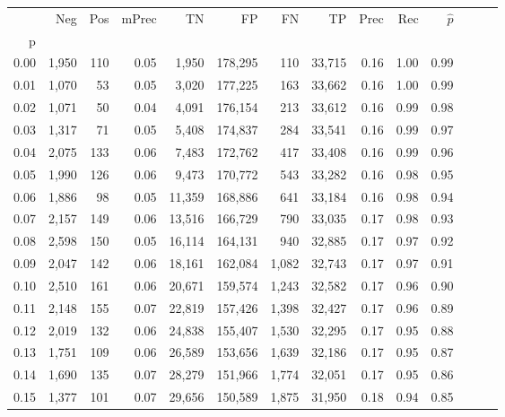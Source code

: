 \begin{tabular}{rrrrrrrrrrrrrr}
\toprule
{} &    Neg &  Pos & mPrec &       TN &       FP &      FN &      TP &  Prec &   Rec & $\hat{p}$ \\
p    &        &      &       &          &          &         &         &       &       &           \\
\midrule
0.00 &  1,950 &  110 &  0.05 &    1,950 &  178,295 &     110 &  33,715 &  0.16 &  1.00 &      0.99 \\
0.01 &  1,070 &   53 &  0.05 &    3,020 &  177,225 &     163 &  33,662 &  0.16 &  1.00 &      0.99 \\
0.02 &  1,071 &   50 &  0.04 &    4,091 &  176,154 &     213 &  33,612 &  0.16 &  0.99 &      0.98 \\
0.03 &  1,317 &   71 &  0.05 &    5,408 &  174,837 &     284 &  33,541 &  0.16 &  0.99 &      0.97 \\
0.04 &  2,075 &  133 &  0.06 &    7,483 &  172,762 &     417 &  33,408 &  0.16 &  0.99 &      0.96 \\
0.05 &  1,990 &  126 &  0.06 &    9,473 &  170,772 &     543 &  33,282 &  0.16 &  0.98 &      0.95 \\
0.06 &  1,886 &   98 &  0.05 &   11,359 &  168,886 &     641 &  33,184 &  0.16 &  0.98 &      0.94 \\
0.07 &  2,157 &  149 &  0.06 &   13,516 &  166,729 &     790 &  33,035 &  0.17 &  0.98 &      0.93 \\
0.08 &  2,598 &  150 &  0.05 &   16,114 &  164,131 &     940 &  32,885 &  0.17 &  0.97 &      0.92 \\
0.09 &  2,047 &  142 &  0.06 &   18,161 &  162,084 &   1,082 &  32,743 &  0.17 &  0.97 &      0.91 \\
0.10 &  2,510 &  161 &  0.06 &   20,671 &  159,574 &   1,243 &  32,582 &  0.17 &  0.96 &      0.90 \\
0.11 &  2,148 &  155 &  0.07 &   22,819 &  157,426 &   1,398 &  32,427 &  0.17 &  0.96 &      0.89 \\
0.12 &  2,019 &  132 &  0.06 &   24,838 &  155,407 &   1,530 &  32,295 &  0.17 &  0.95 &      0.88 \\
0.13 &  1,751 &  109 &  0.06 &   26,589 &  153,656 &   1,639 &  32,186 &  0.17 &  0.95 &      0.87 \\
0.14 &  1,690 &  135 &  0.07 &   28,279 &  151,966 &   1,774 &  32,051 &  0.17 &  0.95 &      0.86 \\
0.15 &  1,377 &  101 &  0.07 &   29,656 &  150,589 &   1,875 &  31,950 &  0.18 &  0.94 &      0.85 \\

\end{tabular}
